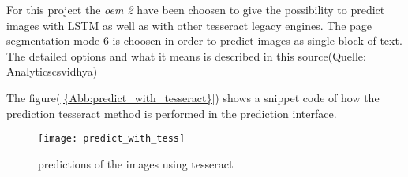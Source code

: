 For this project the \emph{oem 2} have been choosen to give the possibility to predict images with LSTM as well as 
with other tesseract legacy engines.
The page segmentation mode 6 is choosen in order to predict images as single block of text. 
The detailed options and what it means is described in this source(Quelle: Analyticscsvidhya)

\noindent
The figure(\ref{{Abb:predict_with_tesseract}}) shows a snippet code of how the prediction tesseract method is performed in the prediction interface. 

\begin{figure}[htb]
	\centering
	\texttt{[image: predict\_with\_tess]}
	\caption[Prediction with tesseract]{predictions of the images using tesseract} \label{Abb:predict_with_tesseract}
\end{figure}